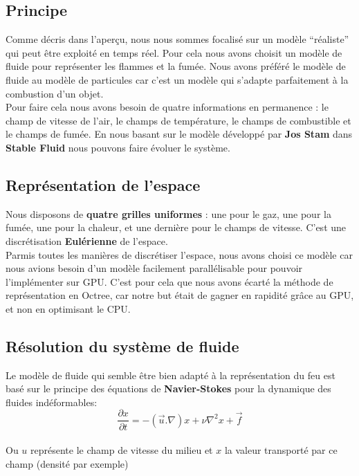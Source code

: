 \documentclass[a4paper,10pt]{article}
\begin{document}
\subsection{Principe}
Comme décris dans l'aperçu, nous nous sommes focalisé sur un modèle
``réaliste'' qui peut être exploité en temps réel. Pour cela nous
avons choisit un modèle de fluide pour représenter les flammes et la fumée. 
Nous avons préféré le modèle de fluide au modèle de particules
car c'est un modèle qui s'adapte parfaitement à la combustion d'un objet.\\

Pour faire cela nous avons besoin de quatre informations en permanence
: le champ de vitesse de l'air, le champs de température, le champs de combustible
 et le champs de fumée. En nous basant sur le modèle développé par \textbf{Jos Stam} 
 dans \textbf{Stable Fluid} nous pouvons faire évoluer le système.\\
 

\subsection{Représentation de l'espace}
Nous disposons de \textbf{quatre grilles uniformes} : une pour le gaz, 
une pour la fumée, une pour la chaleur, et une dernière pour le champs de vitesse.
C'est une discrétisation \textbf{Eulérienne} de l'espace.\\
Parmis toutes les manières de discrétiser l'espace, nous avons choisi ce modèle car
nous avions besoin d'un modèle facilement parallélisable pour pouvoir l'implémenter sur GPU.
C'est pour cela que nous avons écarté la méthode de représentation en Octree, car notre but 
était de gagner en rapidité grâce au GPU, et non en optimisant le CPU.


\subsection{Résolution du système de fluide}
Le modèle de fluide qui semble être bien adapté à la représentation du
feu est basé sur le principe des équations de \textbf{Navier-Stokes} pour la
dynamique des fluides indéformables:\\
\begin{equation}
   \frac{\partial x}{\partial t} = -(\vec{u}.\nabla)x + \nu{\nabla^2}x+ \vec{f} 
\end{equation}
\\
Ou $u$ représente le champ de vitesse du milieu et $x$ la valeur
transporté par ce champ (densité par exemple)\\
\end{document}
